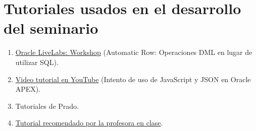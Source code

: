 

\section*{Tutoriales usados en el desarrollo del seminario}

\begin{enumerate}[label=\textcolor{blue}{\arabic*.}, itemsep=1em, leftmargin=2cm]
    \item \href{https://livelabs.oracle.com/ords/r/dbpm/livelabs/run-workshop?p210_wid=3620&p210_wec=&session=100178218366335&cs=1rAZcwFsa7Iqgx_oREx8iAdO7jxK0rA8-laqzK8oXGn0wZnQMG62U6ASmMTHM8lTSzpn56eOQ7l594o18tdxr4g}{Oracle LiveLabs: Workshop} (Automatic Row: Operaciones DML en lugar de utilizar SQL).
    \item \href{https://youtu.be/0wSTYnK5sGA?si=ClmsWIccE3ABWKs4}{Video tutorial en YouTube} (Intento de uso de JavaScript y JSON en Oracle APEX).
    \item Tutoriales de Prado.
    \item \href{https://livelabs.oracle.com/ords/r/dbpm/livelabs/view-workshop?clear=RR,180&wid=848&session=118505985594208}{Tutorial recomendado por la profesora en clase}.  %
\end{enumerate}


